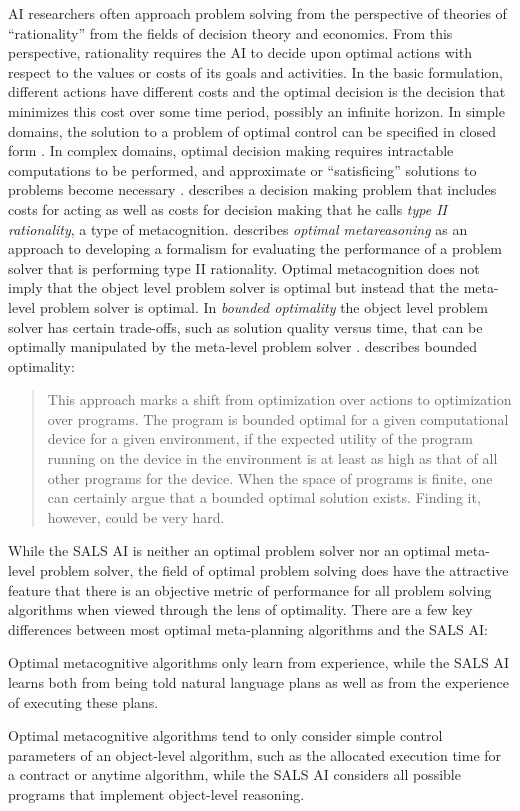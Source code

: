 AI researchers often approach problem solving from the perspective of
theories of ``rationality'' from the fields of decision theory and
economics.  From this perspective, rationality requires the AI to
decide upon optimal actions with respect to the values or costs of its
goals and activities.  In the basic formulation, different actions
have different costs and the optimal decision is the decision that
minimizes this cost over some time period, possibly an infinite
horizon.  In simple domains, the solution to a problem of optimal
control can be specified in closed form \cite[]{bertsekas:1995}.  In
complex domains, optimal decision making requires intractable
computations to be performed, and approximate or ``satisficing''
solutions to problems become necessary \cite[]{simon:1957,simon:1982}.
\cite{good:1971} describes a decision making problem that includes
costs for acting as well as costs for decision making that he calls
{\emph{type II rationality}}, a type of metacognition.
\cite{zilberstein:2008} describes {\emph{optimal metareasoning}} as an
approach to developing a formalism for evaluating the performance of a
problem solver that is performing type II rationality.  Optimal
metacognition does not imply that the object level problem solver is
optimal but instead that the meta-level problem solver is optimal.  In
{\emph{bounded optimality}} the object level problem solver has
certain trade-offs, such as solution quality versus time, that can be
optimally manipulated by the meta-level problem solver
\cite[]{russell:1991}.  \cite{zilberstein:2008} describes bounded
optimality:
\begin{quote}
This approach marks a shift from optimization over actions to
optimization over programs.  The program is bounded optimal for a
given computational device for a given environment, if the expected
utility of the program running on the device in the environment is at
least as high as that of all other programs for the device.  When the
space of programs is finite, one can certainly argue that a bounded
optimal solution exists.  Finding it, however, could be very hard.
\end{quote}
While the SALS AI is neither an optimal problem solver nor an optimal
meta-level problem solver, the field of optimal problem solving does
have the attractive feature that there is an objective metric of
performance for all problem solving algorithms when viewed through the
lens of optimality.  There are a few key differences between most
optimal meta-planning algorithms and the SALS AI:
\begin{packed_enumerate}
\item{Optimal metacognitive algorithms only learn from experience,
  while the SALS AI learns both from being told natural language plans
  as well as from the experience of executing these plans.}
\item{Optimal metacognitive algorithms tend to only consider simple
  control parameters of an object-level algorithm, such as the
  allocated execution time for a contract or anytime algorithm, while
  the SALS AI considers all possible programs that implement
  object-level reasoning.}
\end{packed_enumerate}
